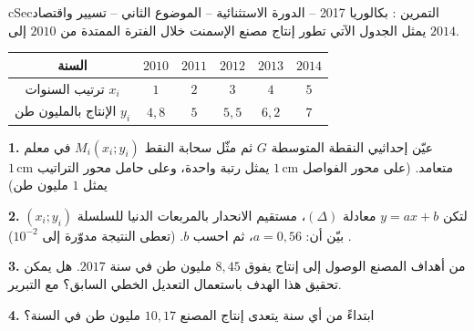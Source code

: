 \documentclass[12pt,a4paper]{article}
\newenvironment{BOX}[2]{\begin{otherlanguage}{english}\begin{arbox}{#1}{#2}}{\end{arbox}\end{otherlanguage}}
\newcounter{exo}
\newenvironment{tamrin}[1]{\stepcounter{exo}\begin{BOX}{cSec}{التمرين \theexo: #1}}{\end{BOX}}
\newcommand{\QQ}[1]{\par\smallskip\textbf{#1.} }
\begin{document}
\begin{tamrin}{بكالوريا 2017 -- الدورة الاستثنائية -- الموضوع الثاني -- تسيير واقتصاد}
يمثل الجدول الآتي تطور إنتاج مصنع الإسمنت خلال الفترة الممتدة من $2010$ إلى $2014$.
\begin{center}
\begin{tabular}{|C|c|c|c|c|c|}\hline
{} السنة & $2010$ & $2011$ & $2012$ & $2013$ & $2014$\\\hline
ترتيب السنوات $x_i$ & $1$ & $2$ & $3$ & $4$ & $5$\\\hline
الإنتاج بالمليون طن $y_i$ & $4{,}8$ & $5$ & $5{,}5$ & $6{,}2$ & $7$\\\hline
\end{tabular}
\end{center}

\QQ{1} عيّن إحداثيي النقطة المتوسطة $G$ ثم مثّل سحابة النقط $M_i(x_i;y_i)$ في معلم متعامد. (على محور الفواصل $1\,\text{cm}$ يمثل رتبة واحدة، وعلى حامل محور التراتيب $1\,\text{cm}$ يمثل $1$ مليون طن)
\QQ{2} لتكن $y=ax+b$ معادلة $(\Delta)$، مستقيم الانحدار بالمربعات الدنيا للسلسلة $(x_i;y_i)$. بيّن أن: $a=0{,}56$، ثم احسب $b$. (تعطى النتيجة مدوّرة إلى $10^{-2}$)
\QQ{3} من أهداف المصنع الوصول إلى إنتاج يفوق $8{,}45$ مليون طن في سنة $2017$. هل يمكن تحقيق هذا الهدف باستعمال التعديل الخطي السابق؟ مع التبرير.
\QQ{4} ابتداءً من أي سنة يتعدى إنتاج المصنع $10{,}17$ مليون طن في السنة؟
\end{tamrin}
\Needspace{16cm}
\end{document}
